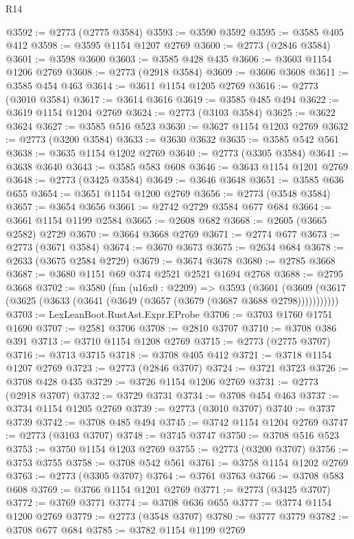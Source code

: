 \begin{lexlean}{R14}
\begin{coremodule}
@3592 := @2773 (@2775 @3584)
@3593 := @3590 @3592
@3595 := @3585 @405 @412
@3598 := @3595 @1154 @1207 @2769
@3600 := @2773 (@2846 @3584)
@3601 := @3598 @3600
@3603 := @3585 @428 @435
@3606 := @3603 @1154 @1206 @2769
@3608 := @2773 (@2918 @3584)
@3609 := @3606 @3608
@3611 := @3585 @454 @463
@3614 := @3611 @1154 @1205 @2769
@3616 := @2773 (@3010 @3584)
@3617 := @3614 @3616
@3619 := @3585 @485 @494
@3622 := @3619 @1154 @1204 @2769
@3624 := @2773 (@3103 @3584)
@3625 := @3622 @3624
@3627 := @3585 @516 @523
@3630 := @3627 @1154 @1203 @2769
@3632 := @2773 (@3200 @3584)
@3633 := @3630 @3632
@3635 := @3585 @542 @561
@3638 := @3635 @1154 @1202 @2769
@3640 := @2773 (@3305 @3584)
@3641 := @3638 @3640
@3643 := @3585 @583 @608
@3646 := @3643 @1154 @1201 @2769
@3648 := @2773 (@3425 @3584)
@3649 := @3646 @3648
@3651 := @3585 @636 @655
@3654 := @3651 @1154 @1200 @2769
@3656 := @2773 (@3548 @3584)
@3657 := @3654 @3656
@3661 := @2742 @2729 @3584 @677 @684
@3664 := @3661 @1154 @1199 @2584
@3665 := @2608 @682
@3668 := @2605 (@3665 @2582) @2729
@3670 := @3664 @3668 @2769
@3671 := @2774 @677
@3673 := @2773 (@3671 @3584)
@3674 := @3670 @3673
@3675 := @2634 @684
@3678 := @2633 (@3675 @2584 @2729)
@3679 := @3674 @3678
@3680 := @2785 @3668
@3687 := @3680 @1151 @69 @374 @2521 @2521 @1694 @2768
@3688 := @2795 @3668
@3702 := @3580
    (fun (u16x0 : @2209) =>
    @3593
      (@3601 (@3609 (@3617 (@3625 (@3633 (@3641 (@3649 (@3657 (@3679 (@3687 @3688 @2798)))))))))))
@3703 := LexLeanBoot.RustAst.Expr.EProbe
@3706 := @3703 @1760 @1751 @1690
@3707 := @2581 @3706
@3708 := @2810 @3707
@3710 := @3708 @386 @391
@3713 := @3710 @1154 @1208 @2769
@3715 := @2773 (@2775 @3707)
@3716 := @3713 @3715
@3718 := @3708 @405 @412
@3721 := @3718 @1154 @1207 @2769
@3723 := @2773 (@2846 @3707)
@3724 := @3721 @3723
@3726 := @3708 @428 @435
@3729 := @3726 @1154 @1206 @2769
@3731 := @2773 (@2918 @3707)
@3732 := @3729 @3731
@3734 := @3708 @454 @463
@3737 := @3734 @1154 @1205 @2769
@3739 := @2773 (@3010 @3707)
@3740 := @3737 @3739
@3742 := @3708 @485 @494
@3745 := @3742 @1154 @1204 @2769
@3747 := @2773 (@3103 @3707)
@3748 := @3745 @3747
@3750 := @3708 @516 @523
@3753 := @3750 @1154 @1203 @2769
@3755 := @2773 (@3200 @3707)
@3756 := @3753 @3755
@3758 := @3708 @542 @561
@3761 := @3758 @1154 @1202 @2769
@3763 := @2773 (@3305 @3707)
@3764 := @3761 @3763
@3766 := @3708 @583 @608
@3769 := @3766 @1154 @1201 @2769
@3771 := @2773 (@3425 @3707)
@3772 := @3769 @3771
@3774 := @3708 @636 @655
@3777 := @3774 @1154 @1200 @2769
@3779 := @2773 (@3548 @3707)
@3780 := @3777 @3779
@3782 := @3708 @677 @684
@3785 := @3782 @1154 @1199 @2769

\end{coremodule}
\end{lexlean}
